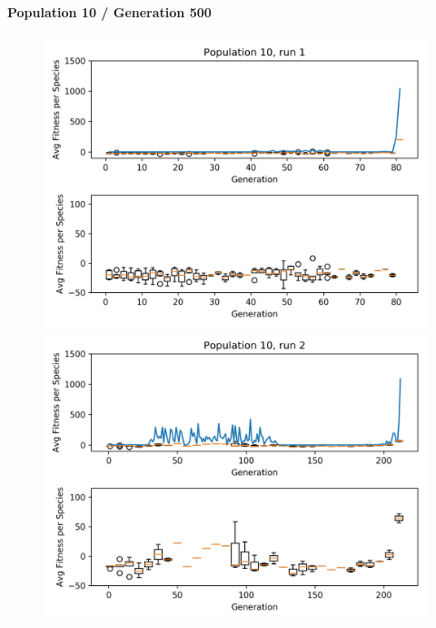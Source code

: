 		\paragraph{Population 10 / Generation 500}
			\begin{figure}[h!]
				\centering
				\begin{minipage}{0.33\textwidth}
					\centering
					\includegraphics[width=1\textwidth]{graphics/flappy/pop10_run1} %
				\end{minipage}\hfill
				\begin{minipage}{0.33\textwidth}
					\centering
					\includegraphics[width=1\textwidth]{graphics/flappy/pop10_run2} %
				\end{minipage}

\end{figure}

